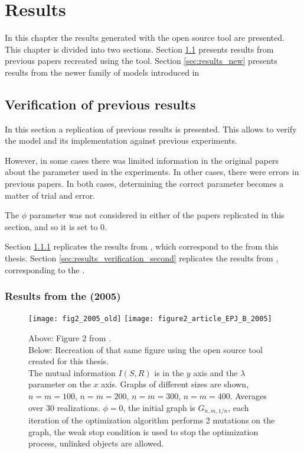 \chapter{Results}
\label{cha:results}

In this chapter the results generated with the open source tool are presented.
This chapter is divided into two sections.
Section \ref{sec:results_verification} presents results from previous papers recreated using the tool.
Section \ref{sec:results_new} presents results from the newer family of models introduced in \cite{Ferrer2018a}

\section{Verification of previous results}
\label{sec:results_verification}

In this section a replication of previous results is presented.
This allows to verify the model and its implementation against previous experiments.

However, in some cases there was limited information in the original papers about the parameter used in the experiments.
In other cases, there were errors in previous papers.
In both cases, determining the correct parameter becomes a matter of trial and error.

The $\phi$ parameter was not considered in either of the papers replicated in this section, and so it is set to 0.

Section \ref{sec:results_verification_first} replicates the results from \cite{Ferrer2005a}, which correspond to the \firstmodel{} from this thesis.
Section \ref{sec:results_verification_second} replicates the results from \cite{Ferrer2003a}, corresponding to the \secondmodel{}.

\subsection{Results from the \firstmodel{} (2005)}
\label{sec:results_verification_first}

\begin{figure}
  \centering
  \texttt{[image: fig2\_2005\_old]}
  \texttt{[image: figure2\_article\_EPJ\_B\_2005]}
  \caption{
    Above: Figure 2 from \cite{Ferrer2005a}.\\
    Below: Recreation of that same figure using the open source tool created for this thesis.\\
    The mutual information $I(S,R)$ is in the $y$ axis and the $\lambda$ parameter on the $x$ axis.
    Graphs of different sizes are shown, $n=m=100$, $n=m=200$, $n=m=300$, $n=m=400$.
    Averages over 30 realizations.
    $\phi=0$, the initial graph is $G_{n,m,1/n}$, each iteration of the optimization algorithm performs 2 mutations on the graph, the weak stop condition is used to stop the optimization process, unlinked objects are allowed.
  }
  \label{fig:fig2_2005}
\end{figure}

